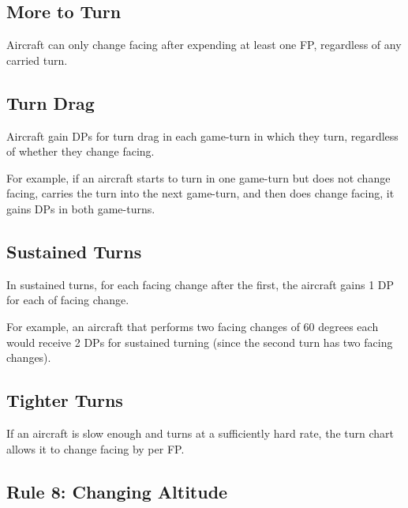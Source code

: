 \documentclass[10pt]{article}
\begin{document}
\subsection{More to Turn} Aircraft can only change facing after expending at least one FP, regardless of any carried turn.

\subsection{Turn Drag} Aircraft gain DPs for turn drag in each game-turn in which they turn, regardless of whether they change facing. 

For example, if an aircraft starts to turn in one game-turn but does not change facing, carries the turn into the next game-turn, and then does change facing, it gains DPs in both game-turns.

\subsection{Sustained Turns} In sustained turns, for each facing change after the first, the aircraft gains 1 DP for each  of facing change. 

For example, an aircraft that performs two facing changes of 60 degrees each would receive 2 DPs for sustained turning (since the second turn has two  facing changes).

\subsection{Tighter Turns} If an aircraft is slow enough and turns at a sufficiently hard rate, the turn chart allows it to change facing by  per FP. 

\subsection{Rule 8: Changing Altitude}
\end{document}
